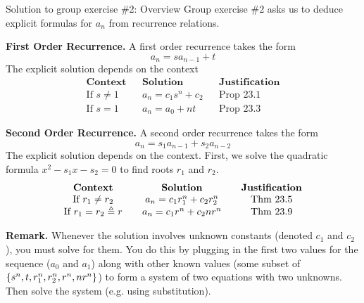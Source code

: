 \documentclass[10pt]{beamer}
\begin{document}
\begin{frame}{Solution to group exercise \#2: Overview}
\footnotesize 
Group exercise \#2 asks us to deduce explicit formulas for $a_n$ from recurrence relations.  

\vfill 

\colorbox{green!30}{\textbf{First Order Recurrence.}} A first order recurrence takes the form
\[ a_n = s a_{n-1}+ t\]
The explicit solution depends on the context 
\[
\begin{array}{cccccc}
\textbf{Context} && \textbf{Solution} && \textbf{Justification} \\
\text{If } s \neq 1 & & a_n = c_1 s^n + c_2 && \text{Prop 23.1} \\
\text{If } s =1 & & a_n = a_0 + nt && \text{Prop 23.3} 
\end{array}
\]

\vfill 

\colorbox{green!30}{\textbf{Second Order Recurrence.}}  A second order recurrence takes the form
\[ a_n = s_1 a_{n-1} + s_2 a_{n-2} \]
The explicit solution depends on the context. First, we solve the quadratic formula $x^2 - s_1 x - s_2 =0$ to find roots $r_1$ and $r_2$.
\[
\begin{array}{cccccc}
\textbf{Context} && \textbf{Solution} && \textbf{Justification} \\
\text{If } r_1 \neq r_2  & & a_n = c_1 r_1^n + c_2 r_2^n && \text{Thm 23.5} \\
\text{If } r_1 = r_2 \triangleq r & & a_n = c_1 r^n + c_2 n r^n && \text{Thm 23.9} 
\end{array}
\]

\vfill 

\colorbox{red!30}{\textbf{Remark.}} Whenever the solution involves unknown constants (denoted $c_1$ and $c_2$), you must solve for them. You do this by plugging in the first two values for the sequence ($a_0$ and $a_1$) along with other known values (some subset of $\{ {s^n, t, r_1^n, r_2^n, r^n, nr^n} \}$) to form a system of two equations with two unknowns.  Then solve the system (e.g. using substitution).   

\end{frame}
\end{document}
